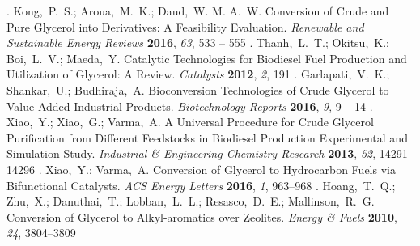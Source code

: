 \documentclass[journal=iecred,manuscript=article]{achemso}
\begin{document}
{\begin{mcitethebibliography}
\mciteBstWouldAddEndPuncttrue
\mciteSetBstMidEndSepPunct{\mcitedefaultmidpunct}
{\mcitedefaultendpunct}{\mcitedefaultseppunct}\relax
\unskip.
Kong,~P.~S.; Aroua,~M.~K.; Daud,~W. M. A.~W. Conversion of Crude and Pure
  Glycerol into Derivatives: A Feasibility Evaluation. \emph{Renewable and
  Sustainable Energy Reviews} \textbf{2016}, \emph{63}, 533 -- 555\relax
\mciteBstWouldAddEndPuncttrue
\mciteSetBstMidEndSepPunct{\mcitedefaultmidpunct}
{\mcitedefaultendpunct}{\mcitedefaultseppunct}\relax
\unskip.
Thanh,~L.~T.; Okitsu,~K.; Boi,~L.~V.; Maeda,~Y. Catalytic Technologies for
  Biodiesel Fuel Production and Utilization of Glycerol: A Review.
  \emph{Catalysts} \textbf{2012}, \emph{2}, 191\relax
\mciteBstWouldAddEndPuncttrue
\mciteSetBstMidEndSepPunct{\mcitedefaultmidpunct}
{\mcitedefaultendpunct}{\mcitedefaultseppunct}\relax
\unskip.
Garlapati,~V.~K.; Shankar,~U.; Budhiraja,~A. Bioconversion Technologies of
  Crude Glycerol to Value Added Industrial Products. \emph{Biotechnology
  Reports} \textbf{2016}, \emph{9}, 9 -- 14\relax
\mciteBstWouldAddEndPuncttrue
\mciteSetBstMidEndSepPunct{\mcitedefaultmidpunct}
{\mcitedefaultendpunct}{\mcitedefaultseppunct}\relax
\unskip.
Xiao,~Y.; Xiao,~G.; Varma,~A. A Universal Procedure for Crude Glycerol
  Purification from Different Feedstocks in Biodiesel Production Experimental
  and Simulation Study. \emph{Industrial \& Engineering Chemistry Research}
  \textbf{2013}, \emph{52}, 14291--14296\relax
\mciteBstWouldAddEndPuncttrue
\mciteSetBstMidEndSepPunct{\mcitedefaultmidpunct}
{\mcitedefaultendpunct}{\mcitedefaultseppunct}\relax
\unskip.
Xiao,~Y.; Varma,~A. Conversion of Glycerol to Hydrocarbon Fuels via
  Bifunctional Catalysts. \emph{ACS Energy Letters} \textbf{2016}, \emph{1},
  963--968\relax
\mciteBstWouldAddEndPuncttrue
\mciteSetBstMidEndSepPunct{\mcitedefaultmidpunct}
{\mcitedefaultendpunct}{\mcitedefaultseppunct}\relax
\unskip.
Hoang,~T.~Q.; Zhu,~X.; Danuthai,~T.; Lobban,~L.~L.; Resasco,~D.~E.;
  Mallinson,~R.~G. Conversion of Glycerol to Alkyl-aromatics over Zeolites.
  \emph{Energy \& Fuels} \textbf{2010}, \emph{24}, 3804--3809\relax
\mciteBstWouldAddEndPuncttrue

\end{mcitethebibliography}}
\end{document}
